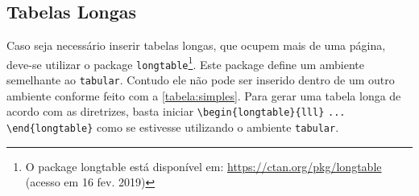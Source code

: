 \documentclass[
  12pt,		%
  a4paper,	%
  openright,%
  oneside,	%
  chapter=TITLE,		%
  section=TITLE,		%
  english,	%
  french,	%
  spanish,	%
  brazil
]{abntex2}
\begin{document}
                
             \subsection {Tabelas Longas}
             \label{chapter:exemplos:tabelas_longas}
             
         Caso seja necessário inserir tabelas longas, que ocupem mais de uma página, deve-se utilizar o package \verb|longtable|\footnote{O package longtable está disponível em: \url{https://ctan.org/pkg/longtable} (acesso em 16 fev. 2019)}. Este package define um ambiente semelhante ao \verb|tabular|. Contudo ele não pode ser inserido dentro de um outro ambiente conforme feito com a \autoref{tabela:simples}. Para gerar uma tabela longa de acordo com as diretrizes, basta iniciar \verb|\begin{longtable}{lll}| \verb|... \end{longtable}| como se estivesse utilizando o ambiente \verb|tabular|.
            
            
\end{document}
